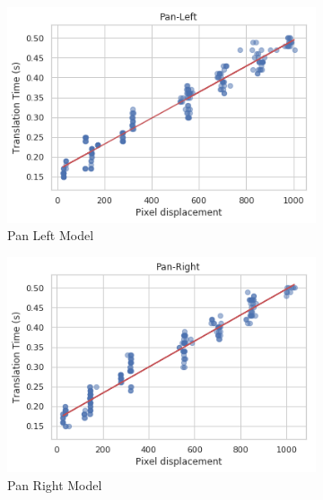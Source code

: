 \documentclass{l4proj}
\begin{document}
\begin{figure}[H]
  \begin{subfigure}[b]{0.5\textwidth}
    \includegraphics[width=\textwidth]{l4template-master/images/pan_left.png}
    \caption{Pan Left Model}
    \label{panleftmodel}
  \end{subfigure}
  \begin{subfigure}[b]{0.5\textwidth}
    \includegraphics[width=\textwidth]{l4template-master/images/pan_right.png}
    \caption{Pan Right Model}
    \label{panrightmodel}
  \end{subfigure}
  \begin{subfigure}[b]{0.5\textwidth}

\end{subfigure}
\end{figure}
\end{document}
